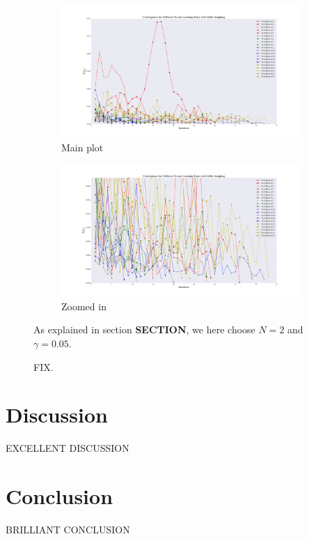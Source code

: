 \documentclass[a4paper, 10pt]{article}
\begin{document}
\begin{figure}[ht!]
	\centering
	\begin{subfigure}[b]{0.8\textwidth}
		\centering
		\includegraphics[width=\textwidth]{../Results/grad_gibbs_interacting.pdf}
		\caption{Main plot}
	\end{subfigure}
	\begin{subfigure}[b]{0.8\textwidth}
		\centering
		\includegraphics[width=\textwidth]{../Results/grad_gibbs_interacting_zoom.pdf}
		\caption{Zoomed in}
	\end{subfigure}
	\caption{FIX.}\label{fig:step_size_and_N_gibbs_interacting}
As explained in section \textbf{SECTION}, we here choose $N=2$ and $\gamma=0.05$.
\end{figure}
\section{Discussion}
	EXCELLENT DISCUSSION
	\section{Conclusion}
	BRILLIANT CONCLUSION
\end{document}
